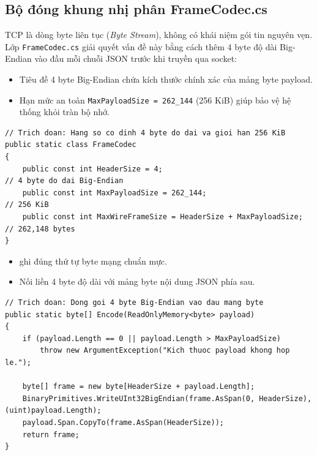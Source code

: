 \documentclass[12pt,a4paper]{article}
\begin{document}
\subsection{Bộ đóng khung nhị phân FrameCodec.cs}
TCP là dòng byte liên tục (\textit{Byte Stream}), không có khái niệm gói tin nguyên vẹn. Lớp \texttt{FrameCodec.cs} giải quyết vấn đề này bằng cách thêm 4 byte độ dài Big-Endian vào đầu mỗi chuỗi JSON trước khi truyền qua socket:

\begin{orientationbox}
\begin{itemize}[leftmargin=1.5em, itemsep=1pt]
  \item Tiêu đề 4 byte Big-Endian chứa kích thước chính xác của mảng byte payload.
  \item Hạn mức an toàn \texttt{MaxPayloadSize = 262\_144} (256 KiB) giúp bảo vệ hệ thống khỏi tràn bộ nhớ.
\end{itemize}
\end{orientationbox}

\begin{lstlisting}[language=CSharp, caption={Ví dụ rút gọn dựa trên mã nguồn hiện tại: Hằng số giới hạn trong FrameCodec.cs}]
// Trich doan: Hang so co dinh 4 byte do dai va gioi han 256 KiB
public static class FrameCodec
{
    public const int HeaderSize = 4;                                 // 4 byte do dai Big-Endian
    public const int MaxPayloadSize = 262_144;                       // 256 KiB
    public const int MaxWireFrameSize = HeaderSize + MaxPayloadSize; // 262,148 bytes
}
\end{lstlisting}

\begin{orientationbox}
\begin{itemize}[leftmargin=1.5em, itemsep=1pt]
  \item {} ghi đúng thứ tự byte mạng chuẩn mực.
  \item Nối liền 4 byte độ dài với mảng byte nội dung JSON phía sau.
\end{itemize}
\end{orientationbox}

\begin{lstlisting}[language=CSharp, caption={Ví dụ rút gọn dựa trên mã nguồn hiện tại: Phương thức Encode trong FrameCodec.cs}]
// Trich doan: Dong goi 4 byte Big-Endian vao dau mang byte
public static byte[] Encode(ReadOnlyMemory<byte> payload)
{
    if (payload.Length == 0 || payload.Length > MaxPayloadSize)
        throw new ArgumentException("Kich thuoc payload khong hop le.");

    byte[] frame = new byte[HeaderSize + payload.Length];
    BinaryPrimitives.WriteUInt32BigEndian(frame.AsSpan(0, HeaderSize), (uint)payload.Length);
    payload.Span.CopyTo(frame.AsSpan(HeaderSize));
    return frame;
}
\end{lstlisting}
\end{document}
